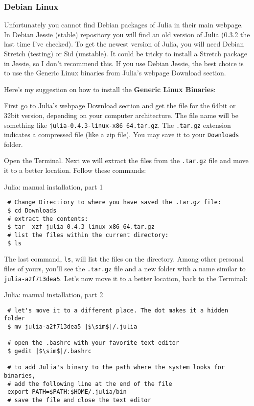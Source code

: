 \subsubsection*{Debian Linux}

Unfortunately you cannot find Debian packages of Julia in their main webpage. In Debian Jessie (stable) repository you will find an old version of Julia (0.3.2 the last time I've checked). To get the newest version of Julia, you will need Debian Stretch (testing) or Sid (unstable). It could be tricky to install a Stretch package in Jessie, so I don't recommend this. If you use Debian Jessie, the best choice is to use the Generic Linux binaries from Julia's webpage Download section.

Here's my suggestion on how to install the \textbf{Generic Linux Binaries}:

First go to Julia's webpage Download section and get the file for the 64bit or 32bit version, depending on your computer architecture. The file name will be something like \texttt{julia-0.4.3-linux-x86\_64.tar.gz}. The \texttt{.tar.gz} extension indicates a compressed file (like a zip file).
You may save it to your \texttt{Downloads} folder.

Open the Terminal. Next we will extract the files from the \texttt{.tar.gz} file and move it to a better location. Follow these commands:

\begin{example}{Julia: manual installation, part 1}
\begin{verbatim}
 # Change Directiory to where you have saved the .tar.gz file:
 $ cd Downloads
 # extract the contents:
 $ tar -xzf julia-0.4.3-linux-x86_64.tar.gz
 # list the files within the current directory:
 $ ls 
\end{verbatim}
\end{example}

The last command, \texttt{ls}, will list the files on the directory. Among other personal files of yours, you'll see the \texttt{.tar.gz} file and a new folder with a name similar to \texttt{julia-a2f713dea5}. Let's now move it to a better location, back to the Terminal:

\begin{example}{Julia: manual installation, part 2}
\begin{verbatim}
 # let's move it to a different place. The dot makes it a hidden folder
 $ mv julia-a2f713dea5 |$\sim$|/.julia
 
 # open the .bashrc with your favorite text editor
 $ gedit |$\sim$|/.bashrc
 
 # to add Julia's binary to the path where the system looks for binaries,
 # add the following line at the end of the file
 export PATH=$PATH:$HOME/.julia/bin
 # save the file and close the text editor 
\end{verbatim}
\end{example}

